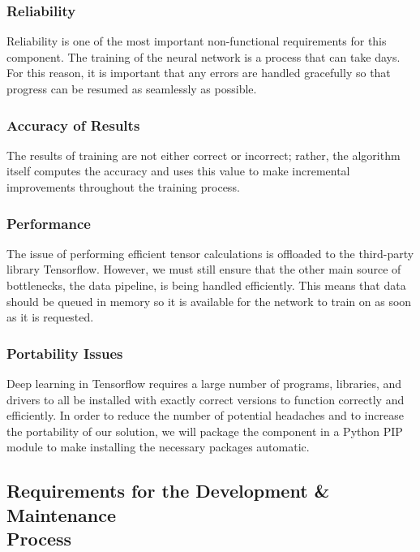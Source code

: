 \documentclass[12pt]{article}
\begin{document}
\subsubsection {Reliability}

Reliability is one of the most important non-functional requirements for this component. The training of the neural network is a process that can take days. For this reason, it is important that any errors are handled gracefully so that progress can be resumed as seamlessly as possible.

\subsubsection {Accuracy of Results}
 
The results of training are not either correct or incorrect; rather, the algorithm itself computes the accuracy and uses this value to make incremental improvements throughout the training process.

\subsubsection {Performance}

The issue of performing efficient tensor calculations is offloaded to the third-party library Tensorflow. However, we must still ensure that the other main source of bottlenecks, the data pipeline, is being handled efficiently. This means that data should be queued in memory so it is available for the network to train on as soon as it is requested.

\subsubsection {Portability Issues}

Deep learning in Tensorflow requires a large number of programs, libraries, and drivers to all be installed with exactly correct versions to function correctly and efficiently. In order to reduce the number of potential headaches and to increase the portability of our solution, we will package the component in a Python PIP module to make installing the necessary packages automatic.

\subsection{Requirements for the Development \& Maintenance\\ Process}
\end{document}
